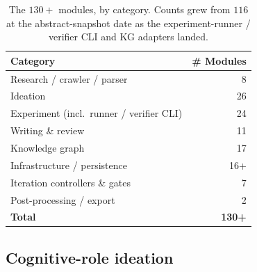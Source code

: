 \documentclass{article}
\begin{document}
\begin{table}[t]
\centering
\caption{The $130{+}$ modules, by category. Counts grew from $116$ at the
abstract-snapshot date as the experiment-runner / verifier CLI and KG
adapters landed.}
\label{tab:modules}
\small
\begin{tabular}{lr}
\toprule
\textbf{Category} & \textbf{\# Modules} \\
\midrule
Research / crawler / parser   & 8 \\
Ideation                      & 26 \\
Experiment (incl.\ runner / verifier CLI) & 24 \\
Writing \& review             & 11 \\
Knowledge graph               & 17 \\
Infrastructure / persistence  & 16+ \\
Iteration controllers \& gates & 7 \\
Post-processing / export      & 2 \\
\midrule
\textbf{Total} & \textbf{130+} \\
\bottomrule
\end{tabular}
\end{table}

\subsection{Cognitive-role ideation}
\label{sec:cognitive}
\end{document}
